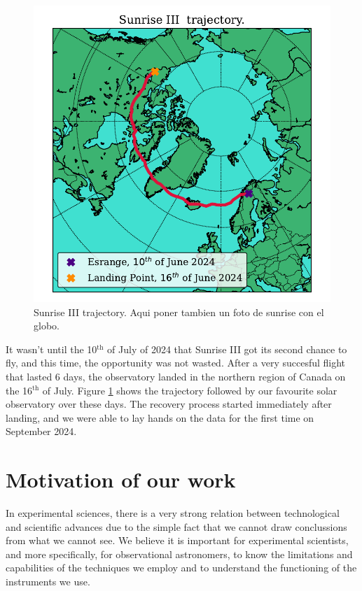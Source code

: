 \begin{figure}
  \centering
  \includegraphics[width = \textwidth]{figures/Introduction/SunriseIII_trajectory.pdf}
  \caption[Sunrise III trajectory]{Sunrise III trajectory. Aqui poner tambien un foto de sunrise con el globo. } 
  \label{fig_intro: sunrise_trajectory}
\end{figure}

It wasn't until the 10$^{\text{th}}$ of July of 2024 that Sunrise III got its second chance to fly, and this time, the opportunity was not wasted. After a very succesful flight that lasted 6 days, the observatory landed in the northern region of Canada on the 16$^{\text{th}}$ of July. Figure \ref{fig_intro: sunrise_trajectory} shows the trajectory followed by our favourite solar observatory over these days. The recovery process started immediately after landing, and we were able to lay hands on the data for the first time on September 2024. 

\section{Motivation of our work}

In experimental sciences, there is a very strong relation between technological and scientific advances due to the simple fact that we cannot draw conclussions from what we cannot see. We believe it is important for experimental scientists, and more specifically, for observational astronomers, to know the limitations and capabilities of the techniques we employ and to understand the functioning of the instruments we use. 

